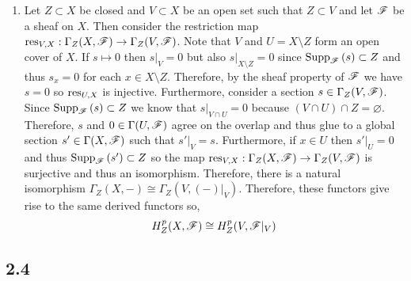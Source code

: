 \documentclass[12pt]{article}
\begin{document}
\begin{enumerate}
\item Let $Z \subset X$ be closed and $V \subset X$ be an open set such that $Z \subset V$ and let $\mathscr{F}$ be a sheaf on $X$. Then consider the restriction map $\mathrm{res}_{V, X} : \Gamma_Z(X, \mathscr{F}) \to \Gamma_Z(V, \mathscr{F})$. Note that $V$ and $U = X \setminus Z$ form an open cover of $X$. If $s \mapsto 0$ then $s|_V = 0$ but also $s|_{X \setminus Z} = 0$ since $\mathrm{Supp}_{\mathscr{F}}\left(s \right) \subset Z$ and thus $s_x = 0$ for each $x \in X \setminus Z$. Therefore, by the sheaf property of $\mathscr{F}$ we have $s = 0$ so $\mathrm{res}_{U,X}$ is injective. Furthermore, consider a section $s \in \Gamma_Z(V, \mathscr{F})$. Since $\mathrm{Supp}_{\mathscr{F}}\left(s \right) \subset Z$ we know that $s |_{V \cap U} = 0$ because $(V \cap U) \cap Z = \varnothing$. Therefore, $s$ and $0 \in \Gamma(U, \mathscr{F})$ agree on the overlap and thus glue to a global section $s' \in \Gamma(X, \mathscr{F})$ such that $s'|_V = s$. Furthermore, if $x \in U$ then $s' |_U = 0$ and thus $\mathrm{Supp}_{\mathscr{F}}\left(s' \right) \subset Z$ so the map $\mathrm{res}_{V, X} : \Gamma_Z(X, \mathscr{F}) \to \Gamma_Z(V, \mathscr{F})$ is surjective and thus an isomorphism. Therefore, there is a natural isomorphism $\Gamma_Z(X, -) \cong \Gamma_Z(V, (-)|_V)$. Therefore, these functors give rise to the same derived functors so,
\[ H^p_Z(X, \mathscr{F}) \cong H^p_Z(V, \mathscr{F}|_V) \] 

\end{enumerate}

\subsection{2.4}
\end{document}
